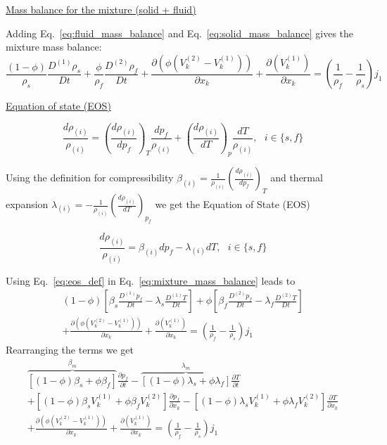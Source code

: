 \documentclass[]{scrreprt}
\begin{document}
\underline{Mass balance for the mixture (solid + fluid)}

Adding Eq.~\ref{eq:fluid_mass_balance} and Eq.~\ref{eq:solid_mass_balance} gives the mixture mass balance:
\begin{equation}
  \label{eq:mixture_mass_balance}
  \frac{(1-\phi)}{\rho_s} \frac{D^{(1)} \rho_s }{D t} +\frac{\phi}{\rho_f} \frac{D^{(2)} \rho_f }{D t} + \frac{\partial( \phi (V^{(2)}_k -V^{(1)}_k))}{\partial x_k}+ \frac{\partial(V^{(1)}_k)}{\partial x_k}  = \left(\frac{1}{\rho_f} - \frac{1}{\rho_s}\right)j_1
\end{equation}

\underline{Equation of state (EOS)}

\begin{equation}
  \label{eq:density_derivative}
  \frac{d\rho_{(i)}}{\rho_{(i)}} = \left( \frac{d\rho_{(i)}}{dp_f} \right)_T \frac{dp_f}{\rho_{(i)}} +\left( \frac{d\rho_{(i)}}{dT} \right)_p \frac{dT}{\rho_{(i)}}, \:\:\:i\in \{s,f\} 
\end{equation}

Using the definition for compressibility $\beta_{(i)}=\frac{1}{\rho_{(i)}}\left( \frac{d\rho_{(i)}}{dp_f} \right)_T$ and thermal expansion $\lambda_{(i)}=-\frac{1}{\rho_{(i)}}\left( \frac{d\rho_{(i)}}{dT} \right)_{p_f}$ we get the Equation of State (EOS)

\begin{equation}
  \label{eq:eos_def}
  \frac{d\rho_{(i)}}{\rho_{(i)}} = \beta_{(i)} dp_f - \lambda_{(i)} dT, \:\:\:i\in \{s,f\} 
\end{equation}

Using Eq.~\ref{eq:eos_def} in Eq.~\ref{eq:mixture_mass_balance} leads to
\begin{multline}
  \label{eq:mixture_mass_balance2}
  (1-\phi) \left[ \beta_s \frac{D^{(1)}p_f}{Dt} - \lambda_s\frac{D^{(1)}T}{Dt}  \right] + \phi \left[ \beta_f \frac{D^{(2)}p_f}{Dt} - \lambda_f\frac{D^{(2)}T}{Dt}  \right] \\
  + \frac{\partial( \phi (V^{(2)}_k -V^{(1)}_k))}{\partial x_k}+ \frac{\partial(V^{(1)}_k)}{\partial x_k}  = \left(\frac{1}{\rho_f} - \frac{1}{\rho_s}\right)j_1
\end{multline}
Rearranging the terms we get
\begin{multline}
  \label{eq:mixture_mass_balance3}
  \overbrace{\left[(1-\phi)\beta_s + \phi\beta_f\right]}^{\beta_m}  \frac{\partial p_f}{\partial t} 
  - \overbrace{\left[(1-\phi)\lambda_s + \phi\lambda_f\right]}^{\lambda_m} \frac{\partial T}{\partial t} \\
  + \left[(1-\phi)\beta_s V^{(1)}_k + \phi\beta_f V^{(2)}_k \right] \frac{\partial p_f}{\partial x_k} 
  - \left[(1-\phi)\lambda_s V^{(1)}_k + \phi\lambda_f V^{(2)}_k \right] \frac{\partial T}{\partial x_k} \\
  + \frac{\partial( \phi (V^{(2)}_k -V^{(1)}_k))}{\partial x_k}+ \frac{\partial(V^{(1)}_k)}{\partial x_k}  = \left(\frac{1}{\rho_f} - \frac{1}{\rho_s}\right)j_1
\end{multline}
\end{document}
